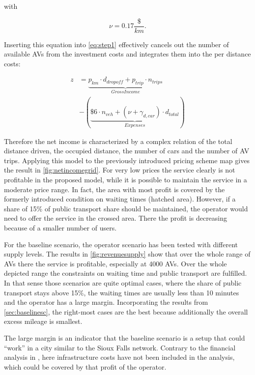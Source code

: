 with

\begin{equation}
\nu = 0.17 \frac{\$}{km}.
\end{equation}

Inserting this equation into \cref{eq:step1} effectively cancels out the number
of available AVs from the investment costs and integrates them into the per
distance costs:

\begin{equation}\begin{aligned}
z
&= \underbrace{p_{km} \cdot d_{dropoff} + p_{trip} \cdot n_{trips}}_{Gross Income}\\
&- \left( \underbrace{\$6 \cdot n_{veh} + (\nu + \gamma_{d,car}) \cdot d_{total}}_{Expenses} \right)
\label{eq:step1}
\end{aligned}\end{equation}

Therefore the net income is characterized by a complex relation of the total distance
driven, the occupied distance, the number of cars and the number of AV trips. Applying
this model to the previously introduced pricing scheme map gives the result in
\cref{fig:netincomegrid}. For very low prices the service clearly is not profitable
in the proposed model, while it is possible to maintain the service in a moderate
price range. In fact, the area with most profit is covered by the formerly introduced
condition on waiting times (hatched area). However, if a share of 15\% of public
transport share should be maintained, the operator would need to offer the service
in the crossed area. There the profit is decreasing because of a smaller
number of users.

For the baseline scenario, the operator scenario has been tested with different
supply levels. The results in \cref{fig:revenuesupply} show that over the whole
range of AVs there the service is profitable, especially at 4000 AVs. Over the whole
depicted range the constraints on waiting time and public transport are fulfilled.
In that sense those scenarios are quite optimal cases, where the share of
public transport stays above 15\%, the waiting times are usually less than 10
minutes and the operator has a large margin. Incorporating the results from
\cref{sec:baselinesc}, the right-most cases are the best because additionally
the overall excess mileage is smallest.

The large margin is an indicator that the baseline scenario is a setup
that could ``work'' in a city similar to the Sioux Falls network. Contrary to
the financial analysis in , here infrastructure costs have not been
included in the analysis, which could be covered by that profit of the operator.

